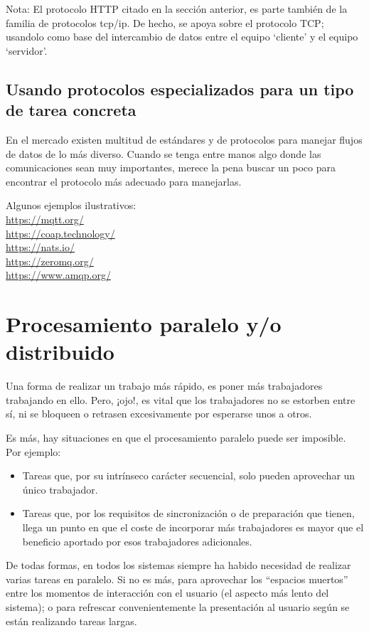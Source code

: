 \documentclass[spanish,12pt,a4paper,final,oneside]{book}
\begin{document}
Nota: El protocolo HTTP citado en la sección anterior, es parte también de la familia de protocolos tcp/ip. De hecho, se apoya sobre el protocolo TCP; usandolo como base del intercambio de datos entre el equipo ‘cliente’ y el equipo ‘servidor’.

\section{Usando protocolos especializados para un tipo de tarea concreta}
En el mercado existen multitud de estándares y de protocolos para manejar flujos de datos de lo más diverso. Cuando se tenga entre manos algo donde las comunicaciones sean muy importantes, merece la pena buscar un poco para encontrar el protocolo más adecuado para manejarlas.

Algunos ejemplos ilustrativos:
\\ \url{https://mqtt.org/}
\\ \url{https://coap.technology/}
\\ \url{https://nats.io/}
\\ \url{https://zeromq.org/}
\\ \url{https://www.amqp.org/}



\chapter{Procesamiento paralelo y/o distribuido}

Una forma de realizar un trabajo más rápido, es poner más trabajadores trabajando en ello. Pero, ¡ojo!, es vital que los trabajadores no se estorben entre sí, ni se bloqueen o retrasen excesivamente por esperarse unos a otros.

Es más, hay situaciones en que el procesamiento paralelo puede ser imposible. Por ejemplo:
\begin{itemize}
\item Tareas que, por su intrínseco carácter secuencial, solo pueden aprovechar un único trabajador. 
\item Tareas que, por los requisitos de sincronización o de preparación que tienen, llega un punto en que el coste de incorporar más trabajadores es mayor que el beneficio aportado por esos trabajadores adicionales.
\end{itemize}

De todas formas, en todos los sistemas siempre ha habido necesidad de realizar varias tareas en paralelo. Si no es más, para aprovechar los ``espacios muertos'' entre los momentos de interacción con el usuario (el aspecto más lento del sistema); o para refrescar convenientemente la presentación al usuario según se están realizando tareas largas.
\end{document}
